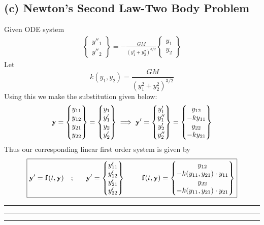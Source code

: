 \subsection*{(c) Newton's Second Law-Two Body Problem}
Given ODE system
\begin{align*}
\begin{Bmatrix}
{y}''_1\\{y}''_2
\end{Bmatrix}
= - \frac{GM}{(y^2_1+y^2_2)^{3/2}}
\begin{Bmatrix}
y_1\\y_2
\end{Bmatrix}
\end{align*}
Let $$ k (y_1,y_2) = \frac{GM}{(y^2_1+y^2_2)^{3/2}}$$
Using this we make the substitution given below: 
\begin{align*}
{\bf y}
=
\begin{Bmatrix}
y_{11}\\y_{12}\\y_{21}\\y_{22}
\end{Bmatrix}
=
\begin{Bmatrix}
y_1\\y'_1\\y_2\\y'_2
\end{Bmatrix}
\implies 
{\bf y}' = 
\begin{Bmatrix}
y'_1\\y''_1\\y'_2\\y''_2
\end{Bmatrix}
=
\begin{Bmatrix}
y_{12}\\-ky_{11}\\y_{22}\\-ky_{21}
\end{Bmatrix}
\end{align*}
Thus our corresponding linear first order system is given by 
\begin{align*}
\boxed{
{\bf y}' = {\bf f}(t,{\bf y})\ \ \ ; \ \ \ \ \ {\bf y}' = \begin{Bmatrix}
y'_{11}\\y'_{12}\\y'_{21}\\y'_{22}
\end{Bmatrix} \ \ \ \ \ \ \ {\bf f}(t,{\bf y})
=
\begin{Bmatrix}
y_{12}\\-k(y_{11},y_{21})\cdot y_{11}\\y_{22}\\-k(y_{11},y_{21})\cdot y_{21}
\end{Bmatrix}
}
\end{align*}\hrule\hrule\hrule
